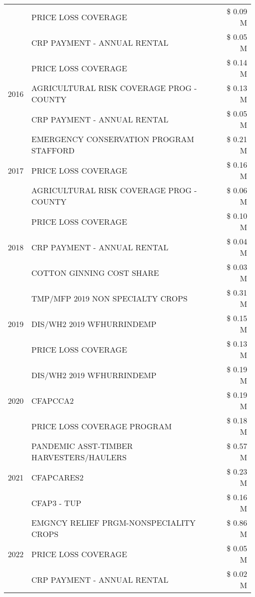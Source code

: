 \begin{tabular}{llr}
 & PRICE LOSS COVERAGE & \$ 0.09 M \\
 & CRP PAYMENT - ANNUAL RENTAL & \$ 0.05 M \\
\cline{1-3}
\multirow[t]{3}{*}{2016} & PRICE LOSS COVERAGE & \$ 0.14 M \\
 & AGRICULTURAL RISK COVERAGE PROG - COUNTY & \$ 0.13 M \\
 & CRP PAYMENT - ANNUAL RENTAL & \$ 0.05 M \\
\cline{1-3}
\multirow[t]{3}{*}{2017} & EMERGENCY CONSERVATION PROGRAM STAFFORD & \$ 0.21 M \\
 & PRICE LOSS COVERAGE & \$ 0.16 M \\
 & AGRICULTURAL RISK COVERAGE PROG - COUNTY & \$ 0.06 M \\
\cline{1-3}
\multirow[t]{3}{*}{2018} & PRICE LOSS COVERAGE & \$ 0.10 M \\
 & CRP PAYMENT - ANNUAL RENTAL & \$ 0.04 M \\
 & COTTON GINNING COST SHARE & \$ 0.03 M \\
\cline{1-3}
\multirow[t]{3}{*}{2019} & TMP/MFP 2019 NON SPECIALTY CROPS & \$ 0.31 M \\
 & DIS/WH2 2019 WFHURRINDEMP & \$ 0.15 M \\
 & PRICE LOSS COVERAGE & \$ 0.13 M \\
\cline{1-3}
\multirow[t]{3}{*}{2020} & DIS/WH2 2019 WFHURRINDEMP & \$ 0.19 M \\
 & CFAPCCA2 & \$ 0.19 M \\
 & PRICE LOSS COVERAGE PROGRAM & \$ 0.18 M \\
\cline{1-3}
\multirow[t]{3}{*}{2021} & PANDEMIC ASST-TIMBER HARVESTERS/HAULERS & \$ 0.57 M \\
 & CFAPCARES2 & \$ 0.23 M \\
 & CFAP3 - TUP & \$ 0.16 M \\
\cline{1-3}
\multirow[t]{3}{*}{2022} & EMGNCY RELIEF PRGM-NONSPECIALITY CROPS & \$ 0.86 M \\
 & PRICE LOSS COVERAGE & \$ 0.05 M \\
 & CRP PAYMENT - ANNUAL RENTAL & \$ 0.02 M \\
\cline{1-3}
\bottomrule
\end{tabular}
